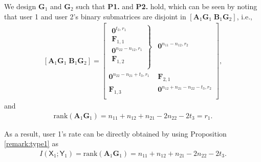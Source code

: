 \documentclass[12pt, draftclsnofoot, onecolumn]{IEEEtran}
\newcommand{\msf}[1]{\mathsf{#1}}
\theoremstyle{definition}
\begin{document}
We design $\boldsymbol{G}_1$ and $\boldsymbol{G}_2$ such that {\bf P1.} and {\bf P2.} hold, which can be seen by noting that user 1 and user 2's binary submatrices are disjoint in $[\boldsymbol{A}_1\boldsymbol{G}_1 \; \boldsymbol{B}_1\boldsymbol{G}_2]$, i.e.,
\begin{align}\label{eq:weak1b_u1}
[\boldsymbol{A}_1\boldsymbol{G}_1 \; \boldsymbol{B}_1\boldsymbol{G}_2]=\begin{bmatrix}
\left. {\begin{array}{*{20}{c}}
\boldsymbol{0}^{t_3,r_1} \\
\boldsymbol{F}_{1,1}\\
\boldsymbol{0}^{n_{22} - n_{12},r_1} \\
\boldsymbol{F}_{1,2}  \\
\end{array}} \right\} & \boldsymbol{0}^{n_{11} - n_{12},r_2}\\
\boldsymbol{0}^{n_{22}-n_{21}+t_3,r_1} & \boldsymbol{F}_{2,1}\\
\boldsymbol{F}_{1,3} & \boldsymbol{0}^{n_{12} +n_{21}- n_{22}-t_3,r_2} \\
\end{bmatrix},
\end{align}
and
\begin{align}
\text{rank}(\boldsymbol{A}_1\boldsymbol{G}_1) = n_{11}+n_{12}+n_{21}-2n_{22} - 2t_3 = r_1.
\end{align}


As a result, user 1's rate can be directly obtained by using Proposition \ref{remark:type1} as
\begin{align}
I(\msf{X}_1;\msf{Y}_1) = \text{rank}(\boldsymbol{A}_1\boldsymbol{G}_1) = n_{11}+n_{12}+n_{21}-2n_{22} - 2t_3.
\end{align}
\end{document}
